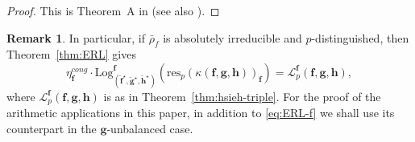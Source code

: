 \documentclass[10pt,letterpaper]{amsart}
\theoremstyle{plain}
\theoremstyle{definition}
\newtheorem{rmk}[thm]{Remark}
\theoremstyle{definition}
\theoremstyle{plain}
\theoremstyle{plain}
\theoremstyle{plain}
\theoremstyle{remark}
\numberwithin{equation}{section}
\newcommand{\rH}{H}
\def\cO{\mathcal O}
\newcommand{\Q}{\mathbf{Q}}
\newcommand{\cR}{\mathbb{I}}
\newcommand{\bff}{{\boldsymbol{f}}}
\newcommand{\bfg}{{\boldsymbol{g}}}
\newcommand{\bfh}{{\boldsymbol{h}}}
\begin{document}
\begin{proof}
This is Theorem~A in \cite{BSV} (see also \cite[Thm.\,5.1]{DR3}).
\end{proof}

\begin{rmk}\label{rmk:harris-kudla-diag}
In particular, if $\bar{\rho}_f$ is absolutely irreducible and $p$-distinguished, then Theorem~\ref{thm:ERL} gives
\begin{equation}\label{eq:ERL-f}
\eta_{\bff}^{cong}\cdot{\mathrm{Log}}^{\bff}_{(\breve{\bff}^\star,\breve{\bfg}^\star,\breve{\bfh}^\star)}({\mathrm{res}}_p(\kappa(\bff,\bfg,\bfh))_\bff)=\mathscr{L}_p^{\bff}(\bff,\bfg,\bfh),
\end{equation}
where $\mathscr{L}_p^{\bff}(\bff,\bfg,\bfh)$ is as in Theorem~\ref{thm:hsieh-triple}. For the proof of the arithmetic  applications in this paper, in addition to \eqref{eq:ERL-f}  we shall use its counterpart in the $\bfg$-unbalanced case.

\end{rmk}

\end{document}
